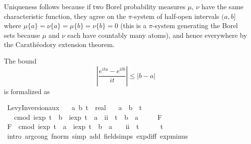 \documentclass{article}
\theoremstyle{definition}
\begin{document}
Uniqueness follows because if two Borel probability measures $\mu$, $\nu$ have the same characteristic function, they agree on the $\pi$-system of half-open intervals $(a,b]$ where $\mu \{a\} = \nu \{a\} = \mu \{b\} = \nu \{b\} = 0$ (this is a $\pi$-system generating the Borel sets because $\mu$ and $\nu$ each have countably many atoms), and hence everywhere by the Carath\'eodory extension theorem.

The bound
\[ \left|\frac{e^{ita} - e^{itb}}{it}\right| \le |b-a| \]
is formalized as

\medskip

\begin{isabellebody}
\isamarkupfalse%
\ Levy{\isacharunderscore}Inversion{\isacharunderscore}aux{}{\isacharcolon}\isanewline
\ \ \ a\ b\ t\ {\isacharcolon}{\isacharcolon}\ real\isanewline
\ \ \ {\isachardoublequoteopen}a\ {\isasymle}\ b{\isachardoublequoteclose}\ \ {\isachardoublequoteopen}t\ {\isasymnoteq}\ {}{\isachardoublequoteclose}\isanewline
\ \ \ {\isachardoublequoteopen}cmod\ {\isacharparenleft}{\isacharparenleft}iexp\ {\isacharparenleft}t\ {\isacharasterisk}\ b{\isacharparenright}\ {\isacharminus}\ iexp\ {\isacharparenleft}t\ {\isacharasterisk}\ a{\isacharparenright}{\isacharparenright}\ {\isacharslash}\ {\isacharparenleft}ii\ {\isacharasterisk}\ t{\isacharparenright}{\isacharparenright}\ {\isasymle}\ b\ {\isacharminus}\ a{\isachardoublequoteclose}\isanewline
\ \ \ \ {\isacharparenleft}\ {\isachardoublequoteopen}{\isacharquery}F\ {\isasymle}\ {\isacharunderscore}{\isachardoublequoteclose}{\isacharparenright}\isanewline
{}\isamarkupfalse%
\ {\isacharminus}\isanewline
\ \ \isamarkupfalse%
\ {\isachardoublequoteopen}{\isacharquery}F\ {\isacharequal}\ cmod\ {\isacharparenleft}iexp\ {\isacharparenleft}t\ {\isacharasterisk}\ a{\isacharparenright}\ {\isacharasterisk}\ {\isacharparenleft}iexp\ {\isacharparenleft}t\ {\isacharasterisk}\ {\isacharparenleft}b\ {\isacharminus}\ a{\isacharparenright}{\isacharparenright}\ {\isacharminus}\ {}{\isacharparenright}\ {\isacharslash}\ {\isacharparenleft}ii\ {\isacharasterisk}\ t{\isacharparenright}{\isacharparenright}{\isachardoublequoteclose}\isanewline
\ \ \ \ \isamarkupfalse%
\ {\isacharbackquoteopen}t\ {\isasymnoteq}\ {}{\isacharbackquoteclose}\ \isamarkupfalse%
\ {\isacharparenleft}intro\ arg{\isacharunderscore}cong{\isacharbrackleft}\ f{\isacharequal}norm{\isacharbrackright}{\isacharparenright}\ {\isacharparenleft}simp\ add{\isacharcolon}\ field{\isacharunderscore}simps\ exp{\isacharunderscore}diff\ exp{\isacharunderscore}minus{\isacharparenright}\isanewline

\end{isabellebody}
\end{document}
